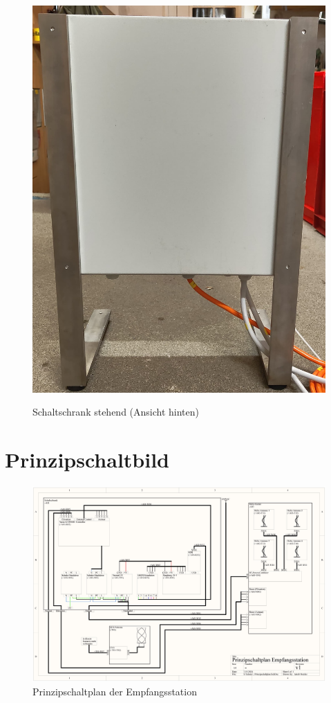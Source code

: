 \begin{figure}[H]
\begin{minipage}[b]{.4\linewidth}
		\includegraphics[width=\linewidth]{../ref/Schaltschrank_stehend_hinten.jpeg}
		\label{fig:schaltschrankstehendhinten}
		\caption{Schaltschrank stehend (Ansicht hinten)}
	\end{minipage}
\end{figure}

\section{Prinzipschaltbild}
\begin{landscape}
	\begin{figure}[H]
		\centering
		\includegraphics[width=\linewidth]{../ref/Prinzipschaltplan.jpg}
		\caption{Prinzipschaltplan der Empfangsstation}
		\label{fig:prinzipschaltplan}
	\end{figure}
\end{landscape}
	




